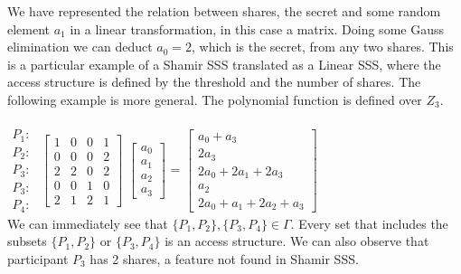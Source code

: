 \documentclass[12pt, a4paper, oneside]{book}
\begin{document}
    We have represented the relation between shares, the secret and some random element $a_1$ in a linear transformation, in this case a matrix. Doing some Gauss elimination we can deduct $a_0{=}2$, which is the secret, from any two shares. This is a particular example of a Shamir SSS translated as a Linear SSS, where the access structure is defined by the threshold and the number of shares.
    The following example is more general. The polynomial function is defined over $Z_3$.
    \\~\\
    {
    \vspace{-1.5cm}
        $
        \begin{matrix}
        P_1:\\
        P_2:\\
        P_3:\\
        P_3:\\
        P_4:
        \end{matrix}
        $
    \vspace{-0,5cm}
        $
        \begin{bmatrix}
        1 & 0 & 0 & 1\\
        0 & 0 & 0 & 2\\
        2 & 2 & 0 & 2\\
        0 & 0 & 1 & 0\\
        2 & 1 & 2 & 1
        \end{bmatrix}
        $
        $
        \begin{bmatrix}
        a_0\\
        a_1\\
        a_2\\
        a_3
        \end{bmatrix}
        $
        {=}
        $
        \begin{bmatrix}
        a_0 {+} a_3\\
        2a_3\\
        2a_0 {+} 2a_1 {+} 2a_3\\
        a_2\\
        2a_0 {+} a_1 {+} 2a_2 {+} a_3
        \end{bmatrix}
        $
    }
    \vspace{2.3cm}
    \\
    
    We can immediately see that $ \{P_1, P_2\}, \{P_3, P_4\} \in \Gamma $. Every set that includes the subsets $ \{P_1, P_2\} $ or $ \{P_3, P_4\} $ is an access structure. We can also observe that participant $ P_3 $ has 2 shares, a feature not found in Shamir SSS.
\end{document}
